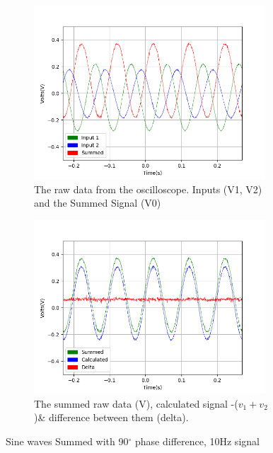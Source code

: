 \begin{figure}[h!]
\centering
\begin{subfigure}[t]{.475\textwidth}
  \centering
  \includegraphics[width=0.95\textwidth, height=0.22\textheight]{figures/Summing/scope_3raw.png}
  \caption{The raw data from the oscilloscope. Inputs (V1, V2) and the Summed Signal (V0)}
 \label{fig:sum_3_og_data}
\end{subfigure}\hfill
\begin{subfigure}[t]{.475\textwidth}
  \centering
  \includegraphics[width=0.95\textwidth, height=0.22\textheight]{figures/Summing/scope_3.png}
  \caption{The summed raw data (V), calculated signal -($v_1 + v_2$)\& difference between them (delta).}
\label{fig:sum_3_calc_data}
\end{subfigure}
\caption{Sine waves Summed with 90$^\circ$ phase difference, 10Hz signal}
\label{fig:sum_3}
\end{figure}

